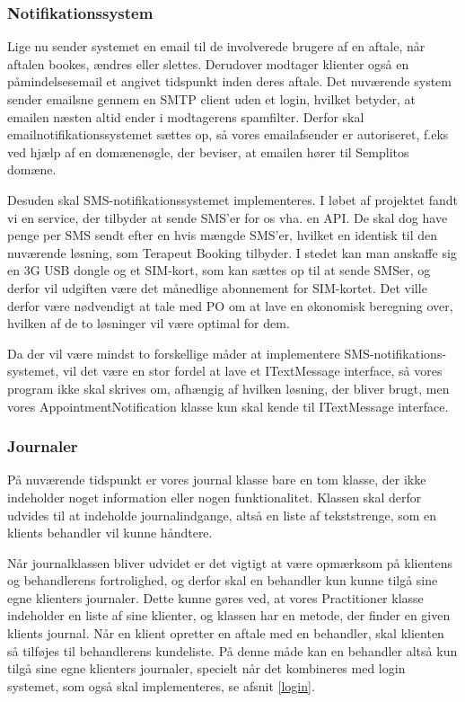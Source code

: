 \subsubsection{Notifikationssystem}

Lige nu sender systemet en email til de involverede brugere af en aftale, når aftalen bookes, ændres eller slettes.
Derudover modtager klienter også en påmindelsesemail et angivet tidspunkt inden deres aftale.
Det nuværende system sender emailsne gennem en  SMTP client uden et login, hvilket betyder, at emailen næsten altid ender i modtagerens spamfilter.
Derfor skal emailnotifikationssystemet sættes op, så vores emailafsender er autoriseret, f.eks ved hjælp af en domænenøgle, der beviser, at emailen hører til Semplitos domæne.

Desuden skal SMS-notifikationssystemet implementeres.
I løbet af projektet fandt vi en service, der tilbyder at sende SMS'er for os vha. en API.
De skal dog have penge per SMS sendt efter en hvis mængde SMS'er, hvilket en identisk til den nuværende løsning, som Terapeut Booking tilbyder.
I stedet kan man anskaffe sig en 3G USB dongle og et SIM-kort, som kan sættes op til at sende SMSer, og derfor vil udgiften være det månedlige abonnement for SIM-kortet.
Det ville derfor være nødvendigt at tale med PO om at lave en økonomisk beregning over, hvilken af de to løsninger vil være optimal for dem.

Da der vil være mindst to forskellige måder at implementere SMS-notifikations-systemet, vil det være en stor fordel at lave et ITextMessage interface, så vores program ikke skal skrives om, afhængig af hvilken løsning, der bliver brugt, men vores AppointmentNotification klasse kun skal kende til ITextMessage interface.

\subsubsection{Journaler}
På nuværende tidspunkt er vores journal klasse bare en tom klasse, der ikke indeholder noget information eller nogen funktionalitet.
Klassen skal derfor udvides til at indeholde journalindgange, altså en liste af tekststrenge, som en klients behandler vil kunne håndtere.

Når journalklassen bliver udvidet er det vigtigt at være opmærksom på klientens og behandlerens fortrolighed, og derfor skal en behandler kun kunne tilgå sine egne klienters journaler.
Dette kunne gøres ved, at vores Practitioner klasse indeholder en liste af sine klienter, og klassen har en metode, der finder en given klients journal.
Når en klient opretter en aftale med en behandler, skal klienten så tilføjes til behandlerens kundeliste.
På denne måde kan en behandler altså kun tilgå sine egne klienters journaler, specielt når det kombineres med login systemet, som også skal implementeres, se afsnit \ref{login}.

